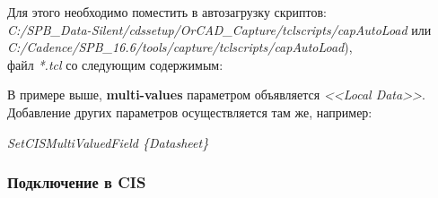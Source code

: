 Для этого необходимо поместить в автозагрузку скриптов: \\
\textit{C:/SPB\_Data-Silent/cdssetup/OrCAD\_Capture/tclscripts/capAutoLoad} или \\
\textit{C:/Cadence/SPB\_16.6/tools/capture/tclscripts/capAutoLoad}), \\
файл \textit{*.tcl} со следующим содержимым:

В примере выше, \textbf{multi-values} параметром объявляется \textit{<<Local Data>>}. Добавление других параметров осуществляется там же, например: 
\begin{center}
	\textit{SetCISMultiValuedField \{Datasheet\}}
\end{center}



\subsubsection{Подключение в CIS} \label{sssec:bd_setup_cis}


